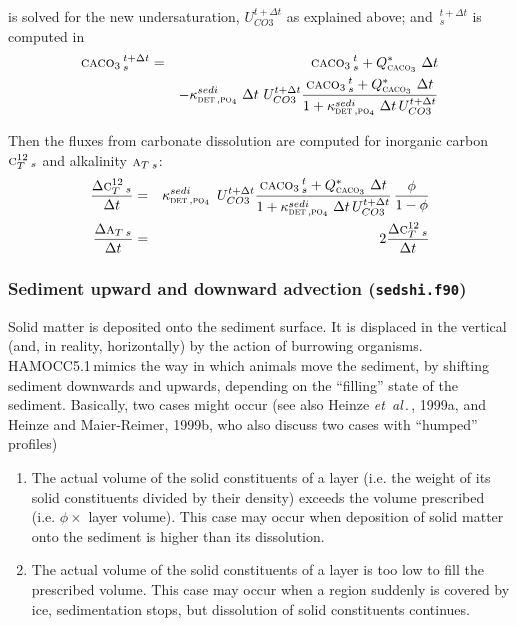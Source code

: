 \documentclass[11pt,a4paper,fleqn,twoside]{article}
\def\pho{\text{\textsc{po$_4$}}\,}
\def\car{\text{\textsc{c$_T^{12}$}}\,}
\def\alk{\text{\textsc{a$_T$}}\,}
\def\det{\text{\textsc{det}}\,}
\def\cal{\text{\textsc{caco$_3$}}\,}
\newcommand{\etal}{{\em et~al\,}.\,}
\newcommand{\ham}{HAMOCC5.1\,}
\begin{document}
is solved for the new undersaturation, $U_{CO3}^{t+\Delta t}$ as explained
above; and \cal$^{t+\Delta t}_s$ is computed in
\begin{eqnarray}
\cal^{t+\Delta t}_s &  = &  \cal^t_s + Q^*_\cal \, \Delta t \\
&& - \kappa^{sedi}_{\det,\pho} \, \Delta t \, \, U_{CO3}^{t+\Delta t}
\frac{ \cal^{t}_s  + Q^*_\cal\, \Delta t}
{1+ \kappa^{sedi}_{\det,\pho} \, \Delta t \, U_{CO3}^{t+\Delta t}} \nonumber
\end{eqnarray}

Then the fluxes from carbonate dissolution are computed for inorganic carbon
$\car_s$ and alkalinity $\alk_s$:
\begin{eqnarray}
\frac{\Delta \car_s}{\Delta t} & = & \kappa^{sedi}_{\det,\pho} \, \, U_{CO3}^{t+\Delta t}
\frac{ \cal^{t}_s  + Q^*_\cal\, \Delta t}
{1+ \kappa^{sedi}_{\det,\pho} \, \Delta t \, U_{CO3}^{t+\Delta t}}  \, \frac{\phi}{1-\phi}\\
\frac{\Delta \alk_s}{\Delta t} & = & 2 \frac{\Delta \car_s}{\Delta t} 
\end{eqnarray}

\subsubsection{\label{sediment_shifting}Sediment upward and downward advection
({\tt sedshi.f90})}

Solid matter is deposited onto the sediment surface. It is displaced in the
vertical (and, in reality, horizontally) by the action of burrowing organisms.
\ham mimics the way in which animals move the sediment, by shifting sediment
downwards and upwards, depending on the ``filling'' state of the sediment.
Basically, two cases might occur (see also Heinze \etal, 1999a,
\nocite{heinze:1999a} and Heinze and Maier-Reimer, 1999b\nocite{heinze:1999b}, 
who also discuss two cases with ``humped'' profiles)

\begin{enumerate}
\item The actual volume of the solid constituents of a layer (i.e. the weight
of  its solid constituents divided by their density) exceeds the volume
prescribed (i.e. $\phi \times$ layer volume). This case may occur when
deposition of solid matter onto the sediment is higher than its dissolution. 
\item The actual volume of the solid constituents of a layer is too low to fill
the prescribed volume. This case may occur when a region suddenly is covered by
ice, sedimentation stops, but dissolution of solid constituents continues.
\end{enumerate} 
\end{document}
